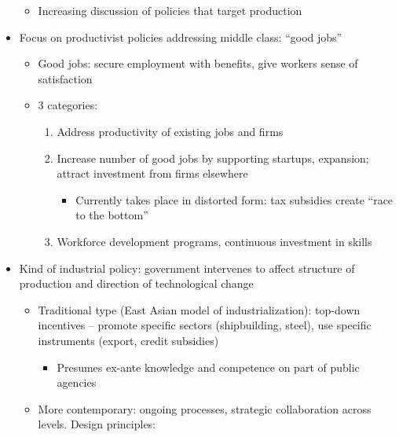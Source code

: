 \begin{itemize}
  \begin{itemize}
  \tightlist
  \item
    Increasing discussion of policies that target production
  \end{itemize}
\item
  Focus on productivist policies addressing middle class: ``good jobs''

  \begin{itemize}
  \tightlist
  \item
    Good jobs: secure employment with benefits, give workers sense of
    satisfaction
  \item
    3 categories:

    \begin{enumerate}
    \def\labelenumi{\arabic{enumi}.}
    \tightlist
    \item
      Address productivity of existing jobs and firms
    \item
      Increase number of good jobs by supporting startups, expansion;
      attract investment from firms elsewhere

      \begin{itemize}
      \tightlist
      \item
        Currently takes place in distorted form: tax subsidies create
        ``race to the bottom''
      \end{itemize}
    \item
      Workforce development programs, continuous investment in skills
    \end{enumerate}
  \end{itemize}
\item
  Kind of industrial policy: government intervenes to affect structure
  of production and direction of technological change

  \begin{itemize}
  \tightlist
  \item
    Traditional type (East Asian model of industrialization): top-down
    incentives -- promote specific sectors (shipbuilding, steel), use
    specific instruments (export, credit subsidies)

    \begin{itemize}
    \tightlist
    \item
      Presumes ex-ante knowledge and competence on part of public
      agencies
    \end{itemize}
  \item
    More contemporary: ongoing processes, strategic collaboration across
    levels. Design principles:


\end{itemize}
\end{itemize}
